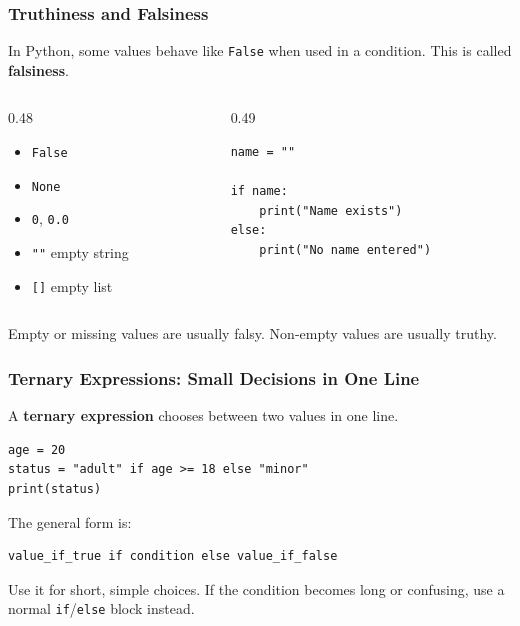 \documentclass[aspectratio=169,10pt]{beamer}
\newcommand{\keyword}[1]{\textcolor{PrimaryBlue}{\textbf{#1}}}
\begin{document}
\begin{frame}[fragile]
\frametitle{Truthiness and Falsiness}
\begin{tcolorbox}[lecturebox,title=Key idea]
In Python, some values behave like \texttt{False} when used in a condition. This is called \keyword{falsiness}.
\end{tcolorbox}

\begin{columns}[T,totalwidth=\textwidth]
\begin{column}{0.48\textwidth}
\begin{tcolorbox}[lecturebox,title=Common falsy values]
\small
\begin{itemize}\setlength\itemsep{0.03cm}
  \item \texttt{False}
  \item \texttt{None}
  \item \texttt{0}, \texttt{0.0}
  \item \texttt{""} empty string
  \item \texttt{[]} empty list
\end{itemize}
\end{tcolorbox}
\end{column}
\begin{column}{0.49\textwidth}
\begin{lstlisting}[style=pycode]
name = ""

if name:
    print("Name exists")
else:
    print("No name entered")
\end{lstlisting}
\end{column}
\end{columns}

\begin{tcolorbox}[lecturebox,title=Rule of thumb]
Empty or missing values are usually falsy. Non-empty values are usually truthy.
\end{tcolorbox}
\end{frame}


\begin{frame}[fragile]
\frametitle{Ternary Expressions: Small Decisions in One Line}
\begin{tcolorbox}[lecturebox,title=Key idea]
A \keyword{ternary expression} chooses between two values in one line.
\end{tcolorbox}

\begin{lstlisting}[style=pycode]
age = 20
status = "adult" if age >= 18 else "minor"
print(status)
\end{lstlisting}

The general form is:
\begin{lstlisting}[style=pycode]
value_if_true if condition else value_if_false
\end{lstlisting}

\begin{tcolorbox}[lecturebox,title=When to use it]
Use it for short, simple choices. If the condition becomes long or confusing, use a normal \texttt{if}/\texttt{else} block instead.
\end{tcolorbox}
\end{frame}
\end{document}
